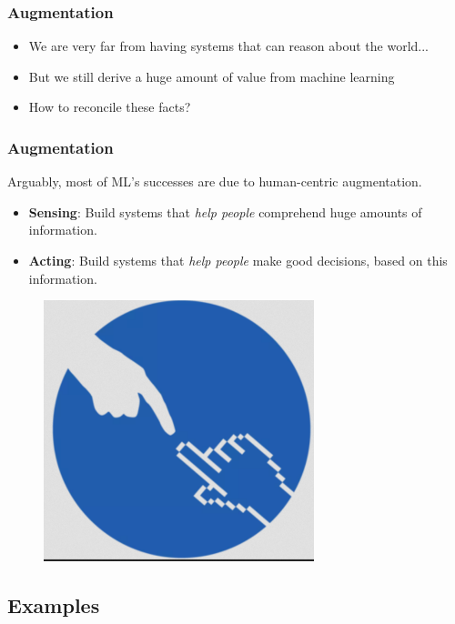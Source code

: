 \documentclass[10pt,mathserif]{beamer}
\begin{document}
\begin{frame}
  \frametitle{Augmentation}
  \begin{itemize}
  \item We are very far from having systems that can reason about the world...
  \item But we still derive a huge amount of value from machine learning
  \item How to reconcile these facts?
  \end{itemize}
\end{frame}

\begin{frame}
  \frametitle{Augmentation}
  Arguably, most of ML's successes are due to human-centric augmentation.
  \begin{itemize}
    \item \textbf{Sensing}: Build systems that \textit{help people} comprehend
      huge amounts of information.
    \item \textbf{Acting}: Build systems that \textit{help people} make good
      decisions, based on this information.
  \end{itemize}
  \begin{figure}[ht]
    \centering
    \includegraphics[width=0.7\textwidth]{figures/hci}
  \end{figure}
\end{frame}

\subsection{Examples}
\label{subsec:label}
\end{document}
